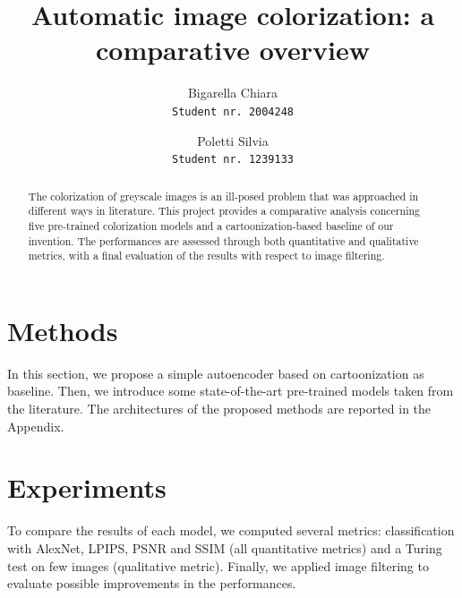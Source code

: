 \documentclass[10pt,twocolumn,letterpaper]{article}
\begin{document}
\title{Automatic image colorization: a comparative overview}
\author{Bigarella Chiara\\
{\tt\small Student nr. 2004248}
\and
Poletti Silvia\\
{\tt\small Student nr. 1239133}
}

\maketitle

\begin{abstract}
   The colorization of greyscale images is an ill-posed problem that was approached in different ways in literature. This project provides a comparative analysis concerning five pre-trained colorization models and a cartoonization-based baseline of our invention. The performances are assessed through both quantitative and qualitative metrics, with a final evaluation of the results with respect to image filtering. 
\end{abstract}





\section{Methods}
In this section, we propose a simple autoencoder based on cartoonization as baseline. Then, we introduce some state-of-the-art pre-trained models taken from the literature. The architectures of the proposed methods are reported in the Appendix.








\section{Experiments}
To compare the results of each model, we computed several metrics: classification with AlexNet, LPIPS, PSNR and SSIM (all quantitative metrics) and a Turing test on few images (qualitative metric). Finally, we applied image filtering to evaluate possible improvements in the performances.
\end{document}
